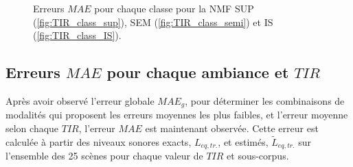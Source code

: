 \begin{figure}%
\centering
{}%
\qquad
{}%
\qquad
{}%
\caption{Erreurs $MAE$ pour chaque classe pour la NMF SUP (\ref{fig:TIR_class_sup}), SEM (\ref{fig:TIR_class_semi}) et IS (\ref{fig:TIR_class_IS}).}
\label{fig:TIR_bar}
\end{figure}


\subsection{Erreurs $MAE$ pour chaque ambiance et $TIR$}
Après avoir observé l'erreur globale $MAE_g$, pour déterminer les combinaisons de modalités qui proposent les erreurs moyennes les plus faibles, et l'erreur moyenne selon chaque $TIR$, l'erreur $MAE$ est maintenant observée. Cette erreur est calculée à partir des niveaux sonores exacts, $L_{eq,tr.}$, et estimés, $\tilde{L}_{eq,tr.}$ sur l'ensemble des 25 scènes pour chaque valeur de $TIR$ et sous-corpus.

